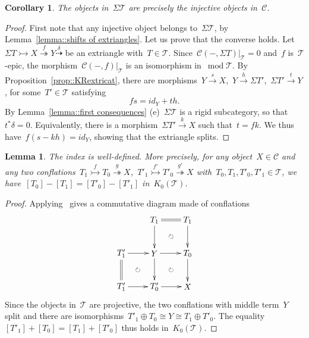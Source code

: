 \documentclass{amsart}
\newtheorem{corollary}[theorem]{Corollary}
\newtheorem{lemma}[theorem]{Lemma}
\theoremstyle{definition}
\newcommand{\cat}{\mathcal{C}}
\newcommand{\susp}{\Sigma}
\newcommand{\MOD}{\operatorname{mod}}
\newcommand{\tc}{\mathcal{T}}
\newcommand{\infl}{\rightarrowtail}
\newcommand{\defl}{\twoheadrightarrow}
\newcommand{\modt}{\MOD\tc}
\newcommand{\kzero}[1]{K_0(#1)}
\begin{document}
\begin{corollary}
The objects in~$\susp\tc$ are precisely the injective objects in~$\cat$.
\end{corollary}

\begin{proof}
First note that any injective object belongs to~$\susp \tc$, by Lemma~\ref{lemma::shifts of extriangles}.
Let us prove that the converse holds.
Let~$\susp T \infl X \overset{f}{\defl} Y\overset{\delta}{\dashrightarrow}$ be an extriangle with~$T\in\tc$.
Since~$\cat(-,\susp T)|_\tc = 0$ and~$f$ is~$\tc$-epic, the morphism~$\cat(-,f)|_\tc$ is an isomorphism in~$\modt$.
By Proposition~\ref{prop::KRextricat}, there are morphisms~$Y\overset{s}{\to} X$,~$Y\xrightarrow{h}\susp T'$,~$\susp T'\xrightarrow{t} Y$, for some~$T'\in\tc$ satisfying
\[
fs = id_Y + th.
\]
By Lemma~\ref{lemma::first consequences} (e)~$\susp\tc$ is a rigid subcategory, so that~$t^\ast\delta=0$.
Equivalently, there is a morphism~$\susp T'\xrightarrow{k} X$ such that~$t=fk$.
We thus have~$f(s-kh)=id_Y$, showing that the extriangle splits.
\end{proof}

\begin{lemma}
\label{lemma::index well-defined extricat}
 The index is well-defined. More precisely, for any object~$X\in\cat$ and any two conflations~$T_1\overset{f}{\infl} T_0 \overset{g}{\defl} X$,~$T'_1\overset{f'}{\infl} T'_0 \overset{g'}{\defl} X$ with~$T_0,T_1,T'_0,T'_1\in\tc$, we have~$[T_0]-[T_1]=[T'_0]-[T'_1]$ in~$\kzero{\tc}$.
\end{lemma}

\begin{proof}
Applying~\cite[Proposition 3.15]{NakaokaPalu} gives a commutative diagram made of conflations
\[
\xy
%
(-7,21)*+{T_1}="-12";
(7,21)*+{T_1}="-14";
%
(-21,7)*+{T'_1}="0";
(-7,7)*+{Y}="2";
(7,7)*+{T_0}="4";
%
(-21,-7)*+{T'_1}="10";
(-7,-7)*+{T'_0}="12";
(7,-7)*+{X}="14";
%
{\ar@{=} "-12";"-14"};
%
{\ar "-12";"2"};
{\ar "-14";"4"};
%
{\ar "0";"2"};
{\ar "2";"4"};
%
{\ar@{=} "0";"10"};
{\ar "2";"12"};
{\ar "4";"14"};
%
{\ar "10";"12"};
{\ar "12";"14"};
%
{\ar@{}|\circlearrowright "-12";"4"};
{\ar@{}|\circlearrowright "0";"12"};
{\ar@{}|\circlearrowright "2";"14"};
\endxy
\]
Since the objects in~$\tc$ are projective, the two conflations with middle term~$Y$ split and there are isomorphisms~$T'_1\oplus T_0 \cong Y \cong T_1\oplus T'_0$.
The equality~$[T'_1]+[T_0]=[T_1]+[T'_0]$ thus holds in~$\kzero{\tc}$.
\end{proof}
\end{document}
